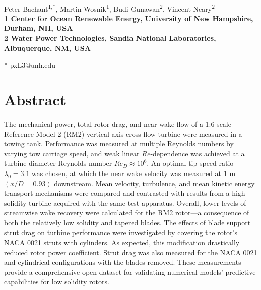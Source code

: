 \documentclass[10pt,letterpaper]{article}
\date{}
\begin{document}
\linenumbers
\vspace*{0.35in}

\begin{flushleft}

{\Large \textbf{}}
\newline
\\
Peter Bachant\textsuperscript{1,*},
Martin Wosnik\textsuperscript{1},
Budi Gunawan\textsuperscript{2},
Vincent Neary\textsuperscript{2}
\\
\bigskip
\bf{1} Center for Ocean Renewable Energy, University of New Hampshire, Durham, NH,
USA
\\
\bf{2} Water Power Technologies, Sandia National Laboratories, Albuquerque, NM, USA
\\
\bigskip

* pxL3@unh.edu

\end{flushleft}

\section*{Abstract}

The mechanical power, total rotor drag, and near-wake flow of a 1:6 scale
Reference Model 2 (RM2) vertical-axis cross-flow turbine were measured in a
towing tank. Performance was measured at multiple Reynolds numbers by varying
tow carriage speed, and weak linear $Re$-dependence was achieved at a turbine
diameter Reynolds number $Re_D \approx 10^6$. An optimal tip speed ratio
$\lambda_0 = 3.1$ was chosen, at which the near wake velocity was measured at 1
m $(x/D=0.93)$ downstream. Mean velocity, turbulence, and mean kinetic energy
transport mechanisms were compared and contrasted with results from a high
solidity turbine acquired with the same test apparatus. Overall, lower levels of
streamwise wake recovery were calculated for the RM2 rotor---a consequence of
both the relatively low solidity and tapered blades. The effects of blade
support strut drag on turbine performance were investigated by covering the
rotor's NACA 0021 struts with cylinders. As expected, this modification
drastically reduced rotor power coefficient. Strut drag was also measured for
the NACA 0021 and cylindrical configurations with the blades removed. These
measurements provide a comprehensive open dataset for validating numerical
models' predictive capabilities for low solidity rotors.
\end{document}
